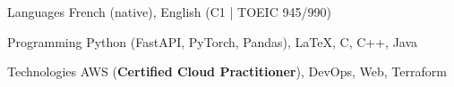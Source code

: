 

\begin{cvskills}

  \cvskill
    {Languages} %
    {French (native), English (C1 | TOEIC 945/990)} %

  \cvskill
    {Programming} %
    {Python (FastAPI, PyTorch, Pandas), \LaTeX, C, C++, Java} %

  \cvskill
    {Technologies} %
    {AWS (\textbf{Certified Cloud Practitioner}), DevOps, Web, Terraform} %

\end{cvskills}
